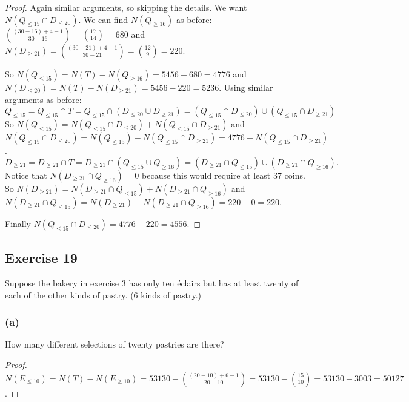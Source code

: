 \documentclass[14pt]{extarticle}
\begin{document}
\begin{proof}
     Again similar arguments, so skipping the details. We want \(N(Q_{\leq 15} \cap D_{\leq 20})\). We can find \(N(Q_{\geq
               16})\) as before: \(\binom{(30-16)+4-1}{30-16} = \binom{17}{14} = 680\) and \(N(D_{\geq 21}) = \binom{(30-21)+4-1}{30-21}
     = \binom{12}{9} = 220\).

     So \(N(Q_{\leq 15}) = N(T) - N(Q_{\geq 16}) = 5456 - 680 = 4776\) and \(N(D_{\leq 20}) = N(T) - N(D_{\geq 21}) = 5456 -
     220 = 5236\). Using similar arguments as before:
     \[
          Q_{\leq 15} = Q_{\leq 15} \cap T = Q_{\leq 15} \cap (D_{\leq 20} \cup D_{\geq 21}) = (Q_{\leq 15} \cap D_{\leq 20}) \cup
          (Q_{\leq 15} \cap D_{\geq 21})
     \]
     So \(N(Q_{\leq 15}) = N(Q_{\leq 15} \cap D_{\leq 20}) + N(Q_{\leq 15} \cap D_{\geq 21})\) and \(N(Q_{\leq 15} \cap
     D_{\leq 20}) = N(Q_{\leq 15}) - N(Q_{\leq 15} \cap D_{\geq 21}) = 4776 - N(Q_{\leq 15} \cap D_{\geq 21})\).
     \[
          D_{\geq 21} = D_{\geq 21} \cap T = D_{\geq 21} \cap (Q_{\leq 15} \cup Q_{\geq 16}) = (D_{\geq 21} \cap Q_{\leq 15}) \cup
          (D_{\geq 21} \cap Q_{\geq 16}).
     \]
     Notice that \(N(D_{\geq 21} \cap Q_{\geq 16}) = 0\) because this would require at least 37 coins. So \(N(D_{\geq 21}) =
     N(D_{\geq 21} \cap Q_{\leq 15}) + N(D_{\geq 21} \cap Q_{\geq 16})\) and \(N(D_{\geq 21} \cap Q_{\leq 15}) = N(D_{\geq 21})
     - N(D_{\geq 21} \cap Q_{\geq 16}) = 220 - 0 = 220\).

     Finally \(N(Q_{\leq 15} \cap D_{\leq 20}) = 4776 - 220 = 4556\).
\end{proof}

\subsection{Exercise 19}
Suppose the bakery in exercise 3 has only ten éclairs but has at least twenty of each of the other kinds of pastry. (6 kinds
of pastry.)

\subsubsection{(a)}
How many different selections of twenty pastries are there?

\begin{proof}
     \(N(E_{\leq 10}) = N(T) - N(E_{\geq 10}) = 53130 - \binom{(20-10)+6-1}{20-10} = 53130 - \binom{15}{10} = 53130 -
     3003 = 50127\).
\end{proof}
\end{document}
